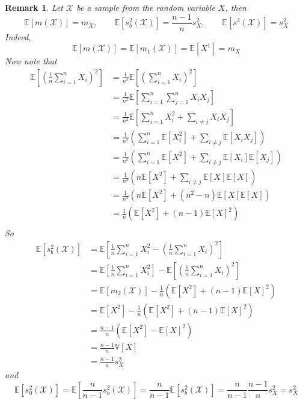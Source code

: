 \documentclass[12pt]{article}
\newtheorem{remark}[theorem]{Remark}
\begin{document}
\begin{remark}\label{ExpecStats} Let $\mathscr{X}$ be a sample from the random variable $X$, then
$$
\mathbb{E}[m(\mathscr{X})]=m_X,
\quad\quad
\mathbb{E}[s_b^2(\mathscr{X})]=\frac{n-1}{n}s_X^2,
\quad\quad
\mathbb{E}[s^2(\mathscr{X})]=s_X^2
$$
Indeed,
$$
\mathbb{E}[m(\mathscr{X})]=\mathbb{E}[m_{1}(\mathscr{X})]=\mathbb{E}[X^1]=m_X
$$
Now note that
\begin{align*}
\mathbb{E}\left[\left(\frac{1}{n}\sum_{i=1}^n X_i\right)^2\right]
&=\frac{1}{n^2}\mathbb{E}\left[\left(\sum_{i=1}^n X_i\right)^2\right]\\
&=\frac{1}{n^2}\mathbb{E}\left[\sum_{i=1}^n\sum_{j=1}^n X_iX_j\right]\\
&=\frac{1}{n^2}\mathbb{E}\left[\sum_{i=1}^n X_i^2+\sum_{i\neq j}X_iX_j\right]\\
&=\frac{1}{n^2}\left(\sum_{i=1}^n\mathbb{E}[X_i^2]+\sum_{i\neq j}\mathbb{E}[X_iX_j]\right)\\
&=\frac{1}{n^2}\left(\sum_{i=1}^n\mathbb{E}[X^2]+\sum_{i\neq j}\mathbb{E}[X_i]\mathbb{E}[X_j]\right)\\
&=\frac{1}{n^2}\left(n\mathbb{E}[X^2]+\sum_{i\neq j}\mathbb{E}[X]\mathbb{E}[X]\right)\\
&=\frac{1}{n^2}\left(n\mathbb{E}[X^2]+(n^2-n)\mathbb{E}[X]\mathbb{E}[X]\right)\\
&=\frac{1}{n}\left(\mathbb{E}[X^2]+(n-1)\mathbb{E}[X]^2\right)\\
\end{align*}
So
\begin{align*}
\mathbb{E}[s_b^2(\mathscr{X})]
&=\mathbb{E}\left[\frac{1}{n}\sum_{i=1}^n X_i^2-\left(\frac{1}{n}\sum_{i=1}^n X_i\right)^2\right]\\
&=\mathbb{E}\left[\frac{1}{n}\sum_{i=1}^n X_i^2\right]-\mathbb{E}\left[\left(\frac{1}{n}\sum_{i=1}^n X_i\right)^2\right]\\
&=\mathbb{E}[m_{2}(\mathscr{X})]-\frac{1}{n}\left(\mathbb{E}[X^2]+(n-1)\mathbb{E}[X]^2\right)\\
&=\mathbb{E}[X^2]-\frac{1}{n}\left(\mathbb{E}[X^2]+(n-1)\mathbb{E}[X]^2\right)\\
&=\frac{n-1}{n}(\mathbb{E}[X^2]-\mathbb{E}[X]^2)\\
&=\frac{n-1}{n}\mathbb{V}[X]\\
&=\frac{n-1}{n}s_X^2
\end{align*}
and
$$
\mathbb{E}[s_{0}^2(\mathscr{X})]
=\mathbb{E}[\frac{n}{n-1}s_b^2(\mathscr{X})]
=\frac{n}{n-1}\mathbb{E}[s_b^2(\mathscr{X})]
=\frac{n}{n-1}\frac{n-1}{n}s_X^2
=s_X^2
$$
\end{remark}
\end{document}
